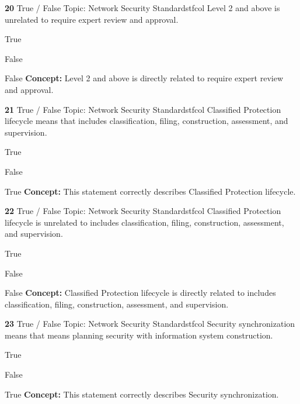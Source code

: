 \documentclass[10pt,a4paper]{article}
\begin{document}
\begin{qcard}{\color{white}\textbf{20} \hfill \small True / False \textbar{} Topic: Network Security Standards}{tfcol}
Level 2 and above is unrelated to require expert review and approval.

\begin{qoptions}
\item True
\item False
\end{qoptions}
\begin{explainbox}{False}
\textbf{Concept:} Level 2 and above is directly related to require expert review and approval.
\end{explainbox}
\end{qcard}

\begin{qcard}{\color{white}\textbf{21} \hfill \small True / False \textbar{} Topic: Network Security Standards}{tfcol}
Classified Protection lifecycle means that includes classification, filing, construction, assessment, and supervision.

\begin{qoptions}
\item True
\item False
\end{qoptions}
\begin{explainbox}{True}
\textbf{Concept:} This statement correctly describes Classified Protection lifecycle.
\end{explainbox}
\end{qcard}

\begin{qcard}{\color{white}\textbf{22} \hfill \small True / False \textbar{} Topic: Network Security Standards}{tfcol}
Classified Protection lifecycle is unrelated to includes classification, filing, construction, assessment, and supervision.

\begin{qoptions}
\item True
\item False
\end{qoptions}
\begin{explainbox}{False}
\textbf{Concept:} Classified Protection lifecycle is directly related to includes classification, filing, construction, assessment, and supervision.
\end{explainbox}
\end{qcard}

\begin{qcard}{\color{white}\textbf{23} \hfill \small True / False \textbar{} Topic: Network Security Standards}{tfcol}
Security synchronization means that means planning security with information system construction.

\begin{qoptions}
\item True
\item False
\end{qoptions}
\begin{explainbox}{True}
\textbf{Concept:} This statement correctly describes Security synchronization.
\end{explainbox}
\end{qcard}
\end{document}
